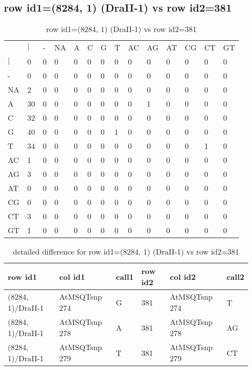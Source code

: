 \subsection{row id1=(8284, 1) (DraII-1) vs row id2=381}
\begin{center}
\begin{longtable}{|l|l|l|l|l|l|l|l|l|l|l|l|l|l|}
\caption{row id1=(8284, 1) (DraII-1) vs row id2=381} \label{table_dm248}\\
\hline
\\
\hline
&$|$&-&NA&A&C&G&T&AC&AG&AT&CG&CT&GT\\
$|$&0&0&0&0&0&0&0&0&0&0&0&0&0\\
-&0&0&0&0&0&0&0&0&0&0&0&0&0\\
NA&2&0&0&0&0&0&0&0&0&0&0&0&0\\
A&30&0&0&0&0&0&0&0&1&0&0&0&0\\
C&32&0&0&0&0&0&0&0&0&0&0&0&0\\
G&40&0&0&0&0&0&1&0&0&0&0&0&0\\
T&34&0&0&0&0&0&0&0&0&0&0&1&0\\
AC&1&0&0&0&0&0&0&0&0&0&0&0&0\\
AG&3&0&0&0&0&0&0&0&0&0&0&0&0\\
AT&0&0&0&0&0&0&0&0&0&0&0&0&0\\
CG&0&0&0&0&0&0&0&0&0&0&0&0&0\\
CT&3&0&0&0&0&0&0&0&0&0&0&0&0\\
GT&1&0&0&0&0&0&0&0&0&0&0&0&0\\
\hline
\end{longtable}
\end{center}

\begin{center}
\begin{longtable}{|l|l|l|l|l|l|}
\caption{detailed difference for row id1=(8284, 1) (DraII-1) vs row id2=381} \label{table_dm249}\\
\hline
row id1&col id1&call1&row id2&col id2&call2\\
\hline
(8284, 1)/DraII-1&AtMSQTsnp 274&G&381&AtMSQTsnp 274&T\\
(8284, 1)/DraII-1&AtMSQTsnp 278&A&381&AtMSQTsnp 278&AG\\
(8284, 1)/DraII-1&AtMSQTsnp 279&T&381&AtMSQTsnp 279&CT\\
\hline
\end{longtable}
\end{center}

